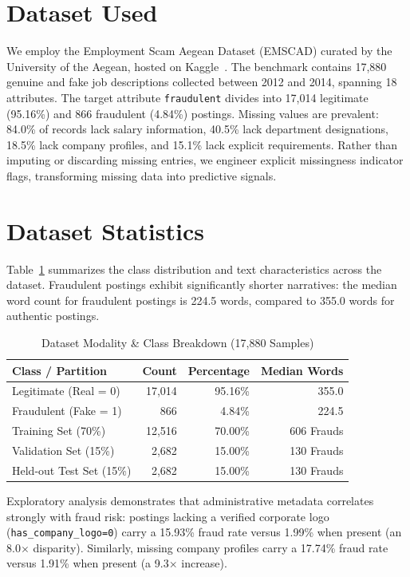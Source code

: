 \documentclass[conference]{IEEEtran}
\begin{document}
\section{Dataset Used}
We employ the Employment Scam Aegean Dataset (EMSCAD) curated by the University of the Aegean, hosted on Kaggle~\cite{emscad}. The benchmark contains 17,880 genuine and fake job descriptions collected between 2012 and 2014, spanning 18 attributes. The target attribute \texttt{fraudulent} divides into 17,014 legitimate (95.16\%) and 866 fraudulent (4.84\%) postings. Missing values are prevalent: 84.0\% of records lack salary information, 40.5\% lack department designations, 18.5\% lack company profiles, and 15.1\% lack explicit requirements. Rather than imputing or discarding missing entries, we engineer explicit missingness indicator flags, transforming missing data into predictive signals.

\section{Dataset Statistics}
Table~\ref{tab:stats} summarizes the class distribution and text characteristics across the dataset. Fraudulent postings exhibit significantly shorter narratives: the median word count for fraudulent postings is 224.5 words, compared to 355.0 words for authentic postings.

\begin{table}[htbp]
\caption{Dataset Modality & Class Breakdown (17,880 Samples)}
\label{tab:stats}
\centering
\small
\begin{tabular}{lrrr}
\toprule
\textbf{Class / Partition} & \textbf{Count} & \textbf{Percentage} & \textbf{Median Words} \\
\midrule
Legitimate (Real = 0) & 17,014 & 95.16\% & 355.0 \\
Fraudulent (Fake = 1) & 866 & 4.84\% & 224.5 \\
\midrule
Training Set (70\%) & 12,516 & 70.00\% & 606 Frauds \\
Validation Set (15\%) & 2,682 & 15.00\% & 130 Frauds \\
Held-out Test Set (15\%) & 2,682 & 15.00\% & 130 Frauds \\
\bottomrule
\end{tabular}
\end{table}

Exploratory analysis demonstrates that administrative metadata correlates strongly with fraud risk: postings lacking a verified corporate logo (\texttt{has\_company\_logo=0}) carry a 15.93\% fraud rate versus 1.99\% when present (an 8.0$\times$ disparity). Similarly, missing company profiles carry a 17.74\% fraud rate versus 1.91\% when present (a 9.3$\times$ increase).
\end{document}
